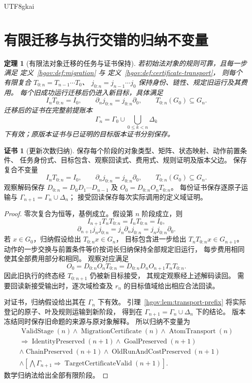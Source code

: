 \documentclass[12pt,a4paper,openany,notitlepage]{report}
\theoremstyle{plain}
\newtheorem{theorem}{定理}[chapter]
\theoremstyle{definition}
\newtheorem*{certificate}{证书}
\theoremstyle{remark}
\begin{document}
\begin{CJK*}{UTF8}{gkai}
\section{有限迁移与执行交错的归纳不变量}
\label{exp:gov:finite-governance-section}

\begin{theorem}[有限法对象迁移的任务与证书保持]
\label{hgov:thm:migration}
若初始法对象的规则可靠，且每一步满足
定义~\ref{hgov:def:migration} 与
定义~\ref{hgov:def:certificate-transport}，
则每个有限复合
$T_{0:n}=T_{n-1}\cdots T_0$、
$j_{0:n}=j_{n-1}\cdots j_0$
保持身份、链性、规定旧运行及其费用。
每个旧成功运行迁移后仍进入新目标，具体满足
\[
 I_nT_{0:n}=I_0,\qquad
 \partial_nj_{0:n}=j_{0:n}\partial_0,\qquad
 T_{0:n}(G_0)\subseteq G_n.
\]
迁移后的证书在完整前提账本
\[
 \Gamma_n=\Gamma_0\cup\bigcup_{0\le k<n}\Delta_k
\]
下有效；原版本证书与已证明的目标版本证书分别保存。
\end{theorem}
\begin{certificate}[更新次数归纳]
保存每个阶段的对象类型、矩阵、状态映射、动作前置条件、
任务身份式、目标包含、观察回读式、费用式、规则证明及版本父边。
保存复合不变量
\[
I_nT_{0:n}=I_0,\qquad
\partial_nj_{0:n}=j_{0:n}\partial_0,\qquad
T_{0:n}(G_0)\subseteq G_n.
\]
观察解码保存 $D_{0:n}=D_0D_1\cdots D_{n-1}$ 及
$O_0=D_{0:n}O_nT_{0:n}$。
每份证书保存逐原子运输与 $\Gamma_{n+1}=\Gamma_n\cup\Delta_n$；
接受回读保存每次实际调用的定义域证明。
\end{certificate}
\begin{proof}
零次复合为恒等，基例成立。假设第 $n$ 阶段成立，则
\[
I_{n+1}T_nT_{0:n}=I_nT_{0:n}=I_0,
\]
\[
\partial_{n+1}j_nj_{0:n}
=j_n\partial_nj_{0:n}=j_nj_{0:n}\partial_0.
\]
若 $x\in G_0$，归纳假设给出 $T_{0:n}x\in G_n$，
目标包含进一步给出
$T_nT_{0:n}x\in G_{n+1}$。
动作的一步交换与前置条件等价按词长归纳保持全部规定旧运行，
每步费用相同使其全部费用部分和相同。
观察对应满足
\[
 O_0
 =D_{0:n}O_nT_{0:n}
 =D_{0:n}D_nO_{n+1}T_nT_{0:n}.
\]
因此旧执行的终态经 $T_{0:n+1}$ 仍被新目标接受，
其规定观察经上述解码读回。
需要回读新接受输出时，逐次域检查及 $r_n$ 的目标值域给出相应合法回读。

对证书，归纳假设给出其在 $\Gamma_n$ 下有效。
引理~\ref{hgov:lem:transport-prefix} 将实际登记的原子、叶及规则运输到新阶段，
得到在 $\Gamma_{n+1}=\Gamma_n\cup\Delta_n$ 下的结论。
版本冻结同时保存旧命题的来源与原对象解释。
所以归纳不变量为
\[
\begin{gathered}
\operatorname{ValidStage}(n)\land\operatorname{MigrationCertificate}(n)
\land\operatorname{AtomTransport}(n)\\
\Rightarrow
\operatorname{IdentityPreserved}(n+1)
\land\operatorname{GoalPreserved}(n+1)\\
\land\operatorname{ChainPreserved}(n+1)
\land\operatorname{OldRunAndCostPreserved}(n+1)\\
\land
\left[\bigwedge\Gamma_{n+1}
\Rightarrow\operatorname{TargetCertificateValid}(n+1)\right].
\end{gathered}
\]
数学归纳法给出全部有限阶段。
\end{proof}


\end{CJK*}
\end{document}
